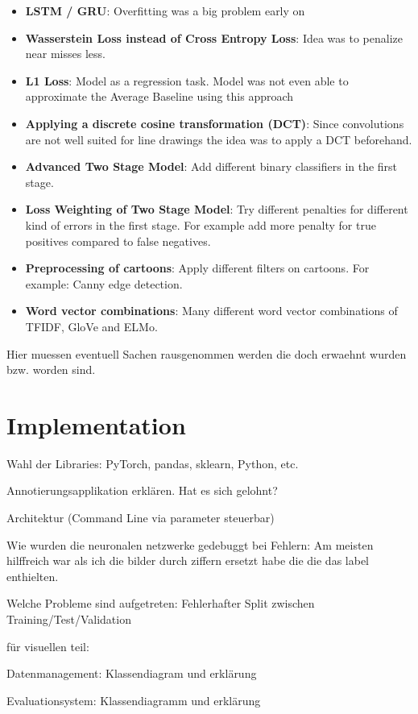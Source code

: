 \documentclass[draft,final,oneside]{vutinfth} %
\begin{document}
\begin{itemize}
\item \textbf{LSTM / GRU}: Overfitting was a big problem early on
\item \textbf{Wasserstein Loss instead of Cross Entropy Loss}: Idea was to penalize near misses less.
\item \textbf{L1 Loss}: Model as a regression task. Model was not even able to approximate the Average Baseline using this approach
\item \textbf{Applying a discrete cosine transformation (DCT)}: Since convolutions are not well suited for line drawings the idea was to apply a DCT beforehand. 
\item \textbf{Advanced Two Stage Model}: Add different binary classifiers in the first stage.
\item \textbf{Loss Weighting of Two Stage Model}: Try different penalties for different kind of errors in the first stage. For example add more penalty for true positives compared to false negatives.
\item \textbf{Preprocessing of cartoons}: Apply different filters on cartoons. For example: Canny edge detection.
\item \textbf{Word vector combinations}: Many different word vector combinations of TFIDF, GloVe and ELMo. 
\end{itemize}

Hier muessen eventuell Sachen rausgenommen werden die doch erwaehnt wurden bzw. worden sind.

\chapter{Implementation}

Wahl der Libraries: PyTorch, pandas, sklearn, Python, etc.

Annotierungsapplikation erklären. Hat es sich gelohnt?

Architektur (Command Line via parameter steuerbar)

Wie wurden die neuronalen netzwerke gedebuggt bei Fehlern: Am meisten hilffreich war als ich die bilder durch ziffern ersetzt habe die die das label enthielten.

Welche Probleme sind aufgetreten: Fehlerhafter Split zwischen Training/Test/Validation

für visuellen teil:

Datenmanagement: Klassendiagram und erklärung

Evaluationsystem: Klassendiagramm und erklärung
\end{document}
